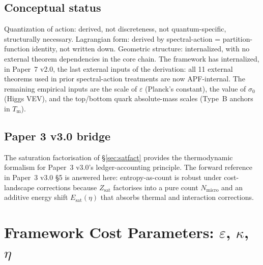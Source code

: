 \documentclass[11pt]{article}
\theoremstyle{definition}
\begin{document}
\subsection{Conceptual status}
Quantization of action: derived, not discreteness, not quantum-specific, structurally necessary.  Lagrangian form: derived by spectral-action = partition-function identity, not written down.  Geometric structure: internalized, with no external theorem dependencies in the core chain.  The framework has internalized, in Paper~7 v2.0, the last external inputs of the derivation: all 11 external theorems used in prior spectral-action treatments are now APF-internal.  The remaining empirical inputs are the scale of $\varepsilon$ (Planck's constant), the value of $\sigma_0$ (Higgs VEV), and the top/bottom quark absolute-mass scales (Type~B anchors in $T_{\mathrm{m}}$).

\subsection{Paper 3 v3.0 bridge}
The saturation factorisation of \S\ref{sec:satfact} provides the thermodynamic formalism for Paper~3 v3.0's ledger-accounting principle.  The forward reference in Paper~3 v3.0 \S 5 is answered here: entropy-as-count is robust under cost-landscape corrections because $Z_{\mathrm{sat}}$ factorises into a pure count $N_{\mathrm{micro}}$ and an additive energy shift $E_{\mathrm{sat}}(\eta)$ that absorbs thermal and interaction corrections.

\appendix

\section{Framework Cost Parameters: $\varepsilon$, $\kappa$, $\eta$}\label{app:cost}
\end{document}

